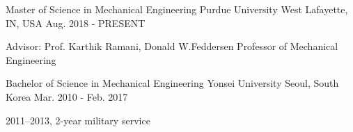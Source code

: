 


\begin{cventries}


\cventry
{Master of Science in Mechanical Engineering} %
{Purdue University} %
{West Lafayette, IN, USA} %
{Aug. 2018 - PRESENT} %
{ %
\begin{cvitems}
\item {Advisor: Prof. Karthik Ramani, Donald W.Feddersen Professor of Mechanical Engineering}
\end{cvitems}
}

\cventry
{Bachelor of Science in Mechanical Engineering} %
{Yonsei University} %
{Seoul, South Korea} %
{Mar. 2010 - Feb. 2017} %
{ %
\begin{cvitems}
\item {2011–2013, 2-year military service}
\end{cvitems}
}

\end{cventries}